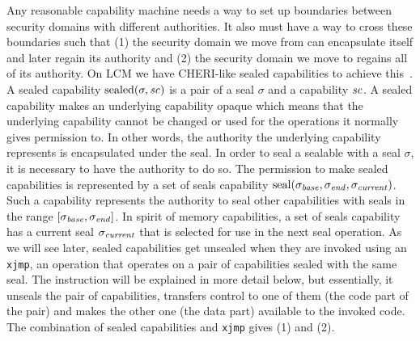 \documentclass[acmsmall,screen]{acmart}\settopmatter{}
\newcommand{\trgcm}{\textsc{LCM}}
\begin{document}
Any reasonable capability machine needs a way to set up boundaries between security domains with different authorities.
It also must have a way to cross these boundaries such that (1) the security domain we move from can encapsulate itself and later regain its authority and (2) the security domain we move to regains all of its authority. 
On \trgcm{} we have CHERI-like sealed capabilities to achieve this~\cite{watson_cheri_2015,watson_fast_2016}.
A sealed capability $\mathrm{sealed}(\sigma,\mathit{sc})$ is a pair of a seal $\sigma$ and a capability $\mathit{sc}$.
A sealed capability makes an underlying capability opaque which means that the underlying capability cannot be changed or used for the operations it normally gives permission to.
In other words, the authority the underlying capability represents is encapsulated under the seal.
In order to seal a sealable with a seal $\sigma$, it is necessary to have the authority to do so.
The permission to make sealed capabilities is represented by a set of seals capability $\mathrm{seal}(\sigma_{\mathit{base}},\sigma_{\mathit{end}},\sigma_{\mathit{current}})$.
Such a capability represents the authority to seal other capabilities with seals in the range $[\sigma_{\mathit{base}},\sigma_{\mathit{end}}]$.
In spirit of memory capabilities, a set of seals capability has a current seal $\sigma_{\mathit{current}}$ that is selected for use in the next seal operation.
As we will see later, sealed capabilities get unsealed when they are invoked using an \texttt{xjmp}, an operation that operates on a pair of capabilities sealed with the same seal.
The instruction will be explained in more detail below, but essentially, it unseals the pair of capabilities, transfers control to one of them (the code part of the pair) and makes the other one (the data part) available to the invoked code.
The combination of sealed capabilities and \texttt{xjmp} gives (1) and (2).
\end{document}
